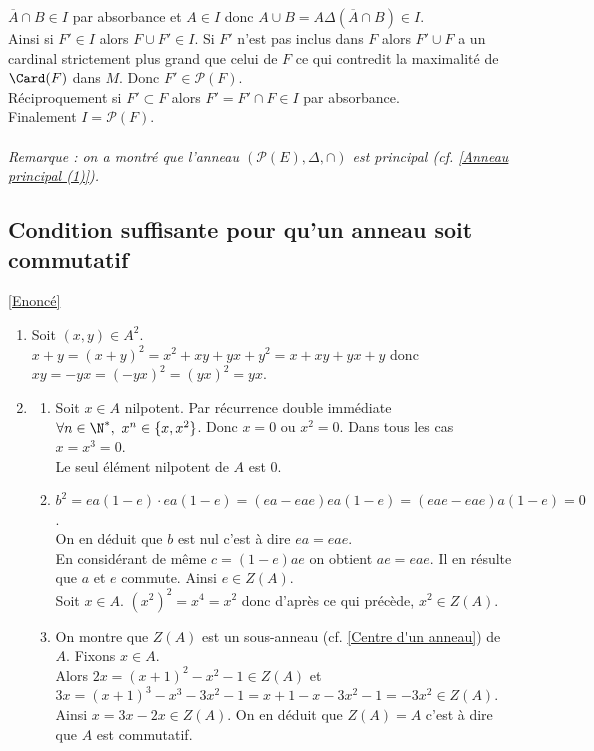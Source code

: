 \documentclass[8pt]{book}
\begin{document}
	$\overline A\cap B\in I$ par absorbance et $A\in I$ donc $A\cup B=A\Delta(\overline A\cap B)\in I$.\\
	Ainsi si $F'\in I$ alors $F\cup F'\in I$. Si $F'$ n'est pas inclus dans $F$ alors $F'\cup F$ a un cardinal strictement plus grand que celui de $F$ ce qui contredit la maximalité de $\Card(F)$ dans $M$. Donc $F'\in \mathcal P(F)$.\\
	Réciproquement si $F'\subset F$ alors $F'=F'\cap F\in I$ par absorbance.\\
	Finalement $I=\mathcal P(F)$.\\\\
	\textit{Remarque : on a montré que l'anneau $(\mathcal P(E),\Delta,\cap)$ est principal (cf. \ref{Anneau principal (1)}).}
	
	\subsection{Condition suffisante pour qu'un anneau soit commutatif }
	\label{Condition suffisante pour qu'un anneau soit commutatif corrigé}
	\textcolor{blue}{\hyperref[Condition suffisante pour qu'un anneau soit commutatif]{[Enoncé]}}\\
	\begin{enumerate}[leftmargin=*]
		\item Soit $(x,y)\in A^2$.\\
		$x+y=(x+y)^2=x^2+xy+yx+y^2=x+xy+yx+y$ donc $xy=-yx=(-yx)^2=(yx)^2=yx$.
		\item \begin{enumerate}[label=\alph*.]
			\item Soit $x\in A$ nilpotent. Par récurrence double immédiate $\forall n\in \N^*,\ x^n\in \{x,x^2\}$. Donc $x=0$ ou $x^2=0$. Dans tous les cas $x=x^3=0$.\\
			Le seul élément nilpotent de $A$ est $0$.
			\item $b^2=ea(1-e)\cdot ea(1-e)=(ea-eae)ea(1-e)=(eae-eae)a(1-e)=0$.\\
			On en déduit que $b$ est nul c'est à dire $ea=eae$.\\
			En considérant de même $c=(1-e)ae$ on obtient $ae=eae$. Il en résulte que $a$ et $e$ commute. Ainsi $e\in Z(A)$.\\
			Soit $x\in A$. $(x^2)^2=x^4=x^2$ donc d'après ce qui précède, $x^2\in Z(A)$.
			\item On montre que $Z(A)$ est un sous-anneau (cf. \ref{Centre d'un anneau}) de $A$. Fixons $x\in A$.\\
			Alors $2x=(x+1)^2-x^2-1\in Z(A)$ et $3x=(x+1)^3-x^3-3x^2-1=x+1-x-3x^2-1=-3x^2\in Z(A)$.\\
			Ainsi $x=3x-2x\in Z(A)$. On en déduit que $Z(A)=A$ c'est à dire que $A$ est commutatif.
		\end{enumerate}
	\end{enumerate}
	
\end{document}
